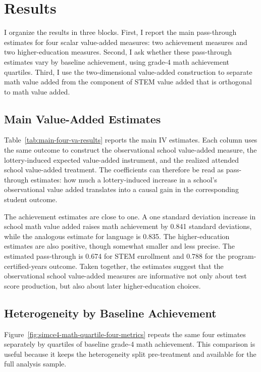 \documentclass[a4paper, article, english, oneside, unknownkeysallowed, 12pt]{memoir}
\begin{document}
\clearpage 
\section{Results}

I organize the results in three blocks. First, I report the main pass-through
estimates for four scalar value-added measures: two achievement measures and two
higher-education measures. Second, I ask whether these pass-through estimates
vary by baseline achievement, using grade-4 math achievement quartiles. Third, I
use the two-dimensional value-added construction to separate math value added
from the component of STEM value added that is orthogonal to math value added.

\subsection{Main Value-Added Estimates}

Table~\ref{tab:main-four-va-results} reports the main IV estimates. Each column
uses the same outcome to construct the observational school value-added measure,
the lottery-induced expected value-added instrument, and the realized attended
school value-added treatment. The coefficients can therefore be read as
pass-through estimates: how much a lottery-induced increase in a school's
observational value added translates into a causal gain in the corresponding
student outcome.

The achievement estimates are close to one. A one standard deviation increase in
school math value added raises math achievement by 0.841 standard deviations,
while the analogous estimate for language is 0.835. The higher-education
estimates are also positive, though somewhat smaller and less precise. The
estimated pass-through is 0.674 for STEM enrollment and 0.788 for the
program-certified-years outcome. Taken together, the estimates suggest that the
observational school value-added measures are informative not only about test
score production, but also about later higher-education choices.



\subsection{Heterogeneity by Baseline Achievement}

Figure~\ref{fig:simce4-math-quartile-four-metrics} repeats the same four
estimates separately by quartiles of baseline grade-4 math achievement. This
comparison is useful because it keeps the heterogeneity split pre-treatment and
available for the full analysis sample.
\end{document}
